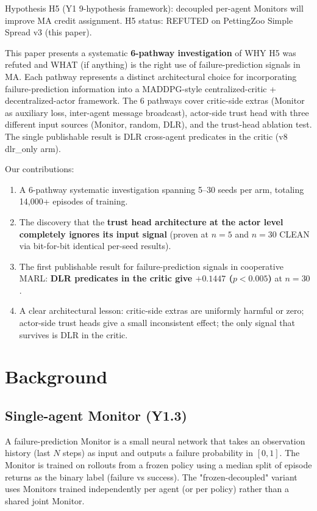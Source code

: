 \documentclass[11pt]{article}
\begin{document}
Hypothesis H5 (Y1 9-hypothesis framework): decoupled per-agent
Monitors will improve MA credit assignment. H5 status: REFUTED on
PettingZoo Simple Spread v3 (this paper).

This paper presents a systematic \textbf{6-pathway investigation} of
WHY H5 was refuted and WHAT (if anything) is the right use of
failure-prediction signals in MA. Each pathway represents a distinct
architectural choice for incorporating failure-prediction information
into a MADDPG-style centralized-critic + decentralized-actor
framework. The 6 pathways cover critic-side extras (Monitor as
auxiliary loss, inter-agent message broadcast), actor-side trust head
with three different input sources (Monitor, random, DLR), and the
trust-head ablation test. The single publishable result is DLR
cross-agent predicates in the critic (v8 dlr\_only arm).

Our contributions:
\begin{enumerate}
  \item A 6-pathway systematic investigation spanning 5--30 seeds per
        arm, totaling 14{,}000+ episodes of training.
  \item The discovery that the \textbf{trust head architecture at the
        actor level completely ignores its input signal} (proven at
        $n=5$ and $n=30$ CLEAN via bit-for-bit identical per-seed
        results).
  \item The first publishable result for failure-prediction signals
        in cooperative MARL: \textbf{DLR predicates in the critic
        give $+0.1447$ ($p<0.005$)} at $n=30$.
  \item A clear architectural lesson: critic-side extras are uniformly
        harmful or zero; actor-side trust heads give a small
        inconsistent effect; the only signal that survives is DLR
        in the critic.
\end{enumerate}

\section{Background}

\subsection{Single-agent Monitor (Y1.3)}

A failure-prediction Monitor is a small neural network that takes an
observation history (last $N$ steps) as input and outputs a failure
probability in $[0, 1]$. The Monitor is trained on rollouts from a
frozen policy using a median split of episode returns as the binary
label (failure vs success). The "frozen-decoupled" variant uses
Monitors trained independently per agent (or per policy) rather
than a shared joint Monitor.
\end{document}

